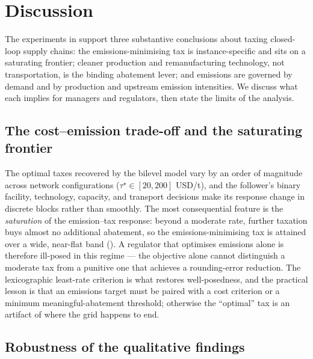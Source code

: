 
\section{Discussion}
\label{sec:discussion}

The experiments in  support three substantive
conclusions about taxing closed-loop supply chains: the emissions-minimising
tax is instance-specific and sits on a saturating frontier; cleaner production
and remanufacturing technology, not transportation, is the binding abatement
lever; and emissions are governed by demand and by production and upstream
emission intensities. We discuss what each implies for managers and
regulators, then state the limits of the analysis.

\subsection{The cost--emission trade-off and the saturating frontier}
\label{sec:disc:tradeoff}

The optimal taxes recovered by the bilevel model vary by an order of magnitude
across network configurations ($\tau^{\star}\in[20,200]$ USD/t), and the
follower's binary facility, technology, capacity, and transport decisions make
its response change in discrete blocks rather than smoothly. The most
consequential feature is the \emph{saturation} of the emission--tax response:
beyond a moderate rate, further taxation buys almost no additional abatement,
so the emissions-minimising tax is attained over a wide, near-flat band
(). A regulator that optimises emissions alone is
therefore ill-posed in this regime --- the objective alone cannot distinguish a
moderate tax from a punitive one that achieves a rounding-error reduction. The
lexicographic least-rate criterion is what restores well-posedness, and the
practical lesson is that an emissions target must be paired with a cost
criterion or a minimum meaningful-abatement threshold; otherwise the
``optimal'' tax is an artifact of where the grid happens to end.

\subsection{Robustness of the qualitative findings}
\label{sec:disc:robustness}

